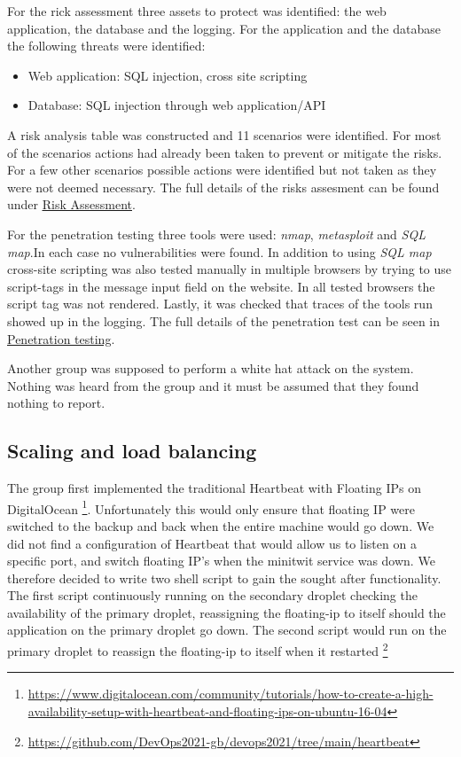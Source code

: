 For the rick assessment three assets to protect was identified: the web application, the database and the logging. For the application and the database the following threats were identified:

\begin{itemize}
    \item Web application: SQL injection, cross site scripting
    \item Database: SQL injection through web application/API
\end{itemize}

A risk analysis table was constructed and 11 scenarios were identified. For most of the scenarios actions had already been taken to prevent or mitigate the risks. For a few other scenarios possible actions were identified but not taken as they were not deemed necessary. The full details of the risks assesment can be found under \underline{\href{https://github.com/DevOps2021-gb/devops2021/wiki/Risk-assesment}{Risk Assessment}}.

For the penetration testing three tools were used: \textit{nmap}, \textit{metasploit} and \textit{SQL map}.In each case no vulnerabilities were found. In addition to using \textit{SQL map} cross-site scripting was also tested manually in multiple browsers by trying to use script-tags in the message input field on the website. In all tested browsers the script tag was not rendered. Lastly, it was checked that traces of the tools run showed up in the logging. The full details of the penetration test can be seen in \underline{\href{https://github.com/DevOps2021-gb/devops2021/wiki/Penetration-testing}{Penetration testing}}. 

Another group was supposed to perform a white hat attack on the system. Nothing was heard from the group and it must be assumed that they found nothing to report.

\subsection{Scaling and load balancing}\label{subsection:scaling} %
The group first implemented the traditional Heartbeat with Floating IPs on DigitalOcean \footnote{\url{https://www.digitalocean.com/community/tutorials/how-to-create-a-high-availability-setup-with-heartbeat-and-floating-ips-on-ubuntu-16-04}}. Unfortunately this would only ensure that floating IP were switched to the backup and back when the entire machine would go down. We did not find a configuration of Heartbeat that would allow us to listen on a specific port, and switch floating IP's when the minitwit service was down. We therefore decided to write two shell script to gain the sought after functionality. The first script continuously running on the secondary droplet checking the availability of the primary droplet, reassigning the floating-ip to itself should the application on the primary droplet go down. The second script would run on the primary droplet to reassign the floating-ip to itself when it restarted \footnote{\url{https://github.com/DevOps2021-gb/devops2021/tree/main/heartbeat}}